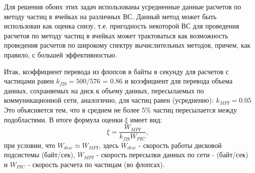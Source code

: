 Для решения обоих этих задач использованы усредненные данные расчетов по методу частиц в ячейках на различных ВС. Данный метод может быть использован как оценка снизу, т.е. пригодность некоторой ВС для проведения расчетов по методу частиц в ячейках может трактоваться как возможность проведения расчетов по широкому спектру вычислительных методов, причем, как правило, с большей эффективностью.

Итак, коэффициент перевода из флопсов в байты в секунду для расчетов с частицами равен
$k_{f2b} = 500/576$ = 0.86   
и коээфициент для перевода объема данных, сохраняемых на диск к объему данных, пересылаемых по коммуникационной сети, аналогично, для частиц равен (усредненно):
$k_{MPI} = 0.05$ 
Это объясняется тем, что в среднем не более 5\% частиц пересылается между подобластями.
В итоге формула оценки $\xi$ имеет вид:
$$
\xi = \frac{W_{MPI}} {k_{f2b} W_{PIC}}, 
$$
при условии, что $W_{disc} \approx W_{MPI}$,
здесь $W_{disc}$ - скорость работы дисковой подсистемы (байт/сек), $W_{MPI}$
- скорость пересылки данных по сети - (байт/сек) и $W_{PIC}$ - скорость расчета по частицам (во флопсах).	

